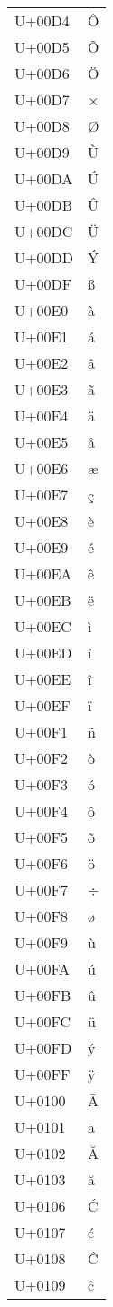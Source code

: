 \documentclass{article}
\begin{document}
\begin{longtable}{ll}
U+00D4 & Ô \\
U+00D5 & Õ \\
U+00D6 & Ö \\
U+00D7 & × \\
U+00D8 & Ø \\
U+00D9 & Ù \\
U+00DA & Ú \\
U+00DB & Û \\
U+00DC & Ü \\
U+00DD & Ý \\
U+00DF & ß \\
U+00E0 & à \\
U+00E1 & á \\
U+00E2 & â \\
U+00E3 & ã \\
U+00E4 & ä \\
U+00E5 & å \\
U+00E6 & æ \\
U+00E7 & ç \\
U+00E8 & è \\
U+00E9 & é \\
U+00EA & ê \\
U+00EB & ë \\
U+00EC & ì \\
U+00ED & í \\
U+00EE & î \\
U+00EF & ï \\
U+00F1 & ñ \\
U+00F2 & ò \\
U+00F3 & ó \\
U+00F4 & ô \\
U+00F5 & õ \\
U+00F6 & ö \\
U+00F7 & ÷ \\
U+00F8 & ø \\
U+00F9 & ù \\
U+00FA & ú \\
U+00FB & û \\
U+00FC & ü \\
U+00FD & ý \\
U+00FF & ÿ \\
U+0100 & Ā \\
U+0101 & ā \\
U+0102 & Ă \\
U+0103 & ă \\
U+0106 & Ć \\
U+0107 & ć \\
U+0108 & Ĉ \\
U+0109 & ĉ \\

\end{longtable}
\end{document}
